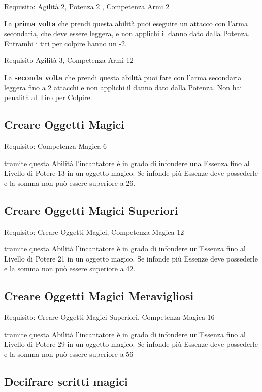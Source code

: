 \documentclass[a4paper,11pt,twoside,openany]{book}
\begin{document}
Requisito: Agilità 2, Potenza 2 , Competenza Armi 2

La \textbf{prima volta} che prendi questa abilità puoi eseguire un attacco con l'arma secondaria, che deve essere leggera, e non applichi il danno dato dalla Potenza. Entrambi i tiri per colpire hanno un -2.

Requisito Agilità 3, Competenza Armi 12

La \textbf{seconda volta} che prendi questa abilità puoi fare con l'arma secondaria leggera fino a 2 attacchi e non applichi il danno dato dalla Potenza. Non hai penalità al Tiro per Colpire.

\subsection{Creare Oggetti Magici}

Requisito: Competenza Magica 6

tramite questa Abilità l'incantatore è in grado di infondere una Essenza fino al Livello di Potere 13 in un oggetto magico. Se infonde più Essenze deve possederle e la somma non può essere superiore a 26.

\subsection{Creare Oggetti Magici Superiori}

Requisito: Creare Oggetti Magici, Competenza Magica 12

tramite questa Abilità l'incantatore è in grado di infondere un'Essenza fino al Livello di Potere 21 in un oggetto magico. Se infonde più Essenze deve possederle e la somma non può essere superiore a 42.

\subsection{Creare Oggetti Magici Meravigliosi}

Requisito: Creare Oggetti Magici Superiori, Competenza Magica 16

tramite questa Abilità l'incantatore è in grado di infondere un'Essenza fino al Livello di Potere 29 in un oggetto magico. Se infonde più Essenze deve possederle e la somma non può essere superiore a 56

\subsection{Decifrare scritti magici}
\end{document}
